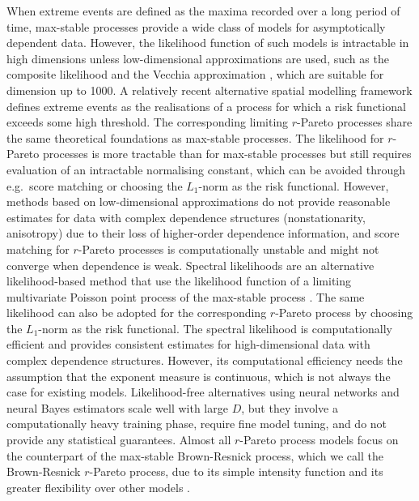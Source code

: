 \documentclass[12pt]{article}
\begin{document}
When extreme events are defined as the maxima recorded over a long period of time, max-stable processes \citep{deHaan:1984, Schlather:2002} provide a wide class of models for asymptotically dependent data. However, the likelihood function of such models is intractable in high dimensions unless low-dimensional approximations are used, such as the composite 
likelihood \citep{Padoan.etal:2010,Davison.etal:2012, Whitaker.etal:2020} and the Vecchia approximation 
\citep{Huser.Zhong:2023}, which are suitable for dimension up to 1000. A relatively recent alternative spatial modelling framework defines extreme events as the realisations of a process for which a risk functional exceeds some high threshold. The corresponding 
limiting $r$-Pareto 
processes \citep{Ferreira.deHaan:2014, Dombry.Ribatet:2015, deFondeville.Davison:2018, deFondeville.Davison:2022} share the same theoretical foundations as max-stable processes. The likelihood for $r$-Pareto processes is more tractable than for max-stable processes but still requires evaluation of an intractable 
normalising constant, which can be avoided through e.g.~score matching \citep{deFondeville.Davison:2018,Lederer.Oesting:2023} or choosing the $L_1$-norm as the risk functional. 
However, methods based on low-dimensional approximations do not provide reasonable estimates for data with complex dependence structures (nonstationarity, anisotropy) due to their loss of higher-order dependence information, and score matching for $r$-Pareto processes is computationally unstable and might not converge when dependence is weak. 
Spectral likelihoods are an alternative likelihood-based 
method
that use the likelihood function of a limiting multivariate Poisson point process of the max-stable process \citep{Coles.Tawn:1991,Engelke.etal:2015,Wadsworth.Tawn:2014}. The same likelihood can also be adopted for the corresponding $r$-Pareto process by choosing the $L_1$-norm as the risk functional. The spectral likelihood is computationally efficient and provides consistent estimates for high-dimensional data with complex dependence structures. However, its computational efficiency needs the assumption that the exponent measure is continuous, which is not always the case for existing models. Likelihood-free alternatives using neural networks \citep{Lenzi.etal:2023} and neural Bayes estimators \citep{Sainsbury.Zammit.Huser:2024, Richards.etal:2024} scale well with large $D$, but they involve a computationally heavy training phase, require fine model tuning, and do not provide any statistical guarantees. Almost all $r$-Pareto process models
focus on the counterpart of the max-stable Brown-Resnick process, which we call the Brown-Resnick $r$-Pareto process, 
due to its simple intensity function and its greater flexibility over other models \citep[see, e.g.,][]{deFondeville.Davison:2018, Richards.etal:2024, Hector.Reich:2024}.          
\end{document}
